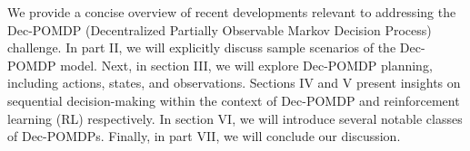 We provide a concise overview of recent developments relevant to addressing the Dec-POMDP (Decentralized Partially Observable Markov Decision Process) challenge. In part II, we will explicitly discuss sample scenarios of the Dec-POMDP model. Next, in section III, we will explore Dec-POMDP planning, including actions, states, and observations. Sections IV and V present insights on sequential decision-making within the context of Dec-POMDP and reinforcement learning (RL) respectively. In section VI, we will introduce several notable classes of Dec-POMDPs. Finally, in part VII, we will conclude our discussion.



